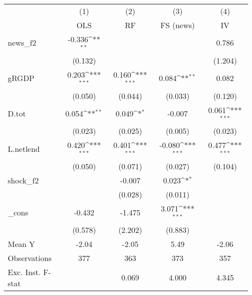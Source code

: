 {
\def\sym#1{\ifmmode^{#1}\else\(^{#1}\)\fi}
\begin{tabular}{l*{4}{c}}
\toprule
            &\multicolumn{1}{c}{(1)}&\multicolumn{1}{c}{(2)}&\multicolumn{1}{c}{(3)}&\multicolumn{1}{c}{(4)}\\
            &\multicolumn{1}{c}{OLS}&\multicolumn{1}{c}{RF}&\multicolumn{1}{c}{FS (news)}&\multicolumn{1}{c}{IV}\\
\midrule
news\_f2     &      -0.336\sym{**} &                     &                     &       0.786         \\
            &     (0.132)         &                     &                     &     (1.204)         \\
\addlinespace
gRGDP       &       0.203\sym{***}&       0.160\sym{***}&       0.084\sym{**} &       0.082         \\
            &     (0.050)         &     (0.044)         &     (0.033)         &     (0.120)         \\
\addlinespace
D.tot       &       0.054\sym{**} &       0.049\sym{*}  &      -0.007         &       0.061\sym{***}\\
            &     (0.023)         &     (0.025)         &     (0.005)         &     (0.023)         \\
\addlinespace
L.netlend   &       0.420\sym{***}&       0.401\sym{***}&      -0.080\sym{***}&       0.477\sym{***}\\
            &     (0.050)         &     (0.071)         &     (0.027)         &     (0.104)         \\
\addlinespace
shock\_f2    &                     &      -0.007         &       0.023\sym{*}  &                     \\
            &                     &     (0.028)         &     (0.011)         &                     \\
\addlinespace
\_cons      &      -0.432         &      -1.475         &       3.071\sym{***}&                     \\
            &     (0.578)         &     (2.202)         &     (0.883)         &                     \\
\midrule
Mean Y      &       -2.04         &       -2.05         &        5.49         &       -2.06         \\
Observations&         377         &         363         &         373         &         357         \\
Exc. Inst. F-stat&                     &       0.069         &       4.000         &       4.345         \\
\bottomrule
\end{tabular}
}
